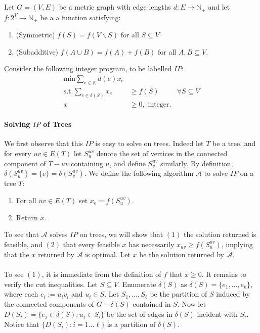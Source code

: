\documentclass[letterpaper,12pt,oneside,onecolumn]{article}
\newcommand{\N}{\mathbb{N}} \newcommand{\R}{\mathbb{R}}
\newcommand{\cA}{\mathcal{A}} \newcommand{\cB}{\mathcal{B}}
\begin{document}
\section{}
\paragraph{}
Let $G=(V,E)$ be a metric graph with edge lengths $d: E \rightarrow \N_+$ and let $f : 2^V \rightarrow \N_+$  be a a function satisfying:
\begin{enumerate}
\item (Symmetric) $f(S) = f(V\backslash S)$ for all $S \subseteq V$
\item (Subadditive) $f(A \cup B) = f(A) + f(B)$ for all $A,B \subseteq V$.
\end{enumerate}
Consider the following integer program, to be labelled $IP$:
\begin{align*}
\text{min} \sum_{e \in E} d(e) x_e\\
\text{s.t.} \sum_{e\in \delta(S)} x_e &\geq f(S) &\forall S \subseteq V \\
x &\geq 0, \text{ integer}.
\end{align*}
\paragraph{Solving $IP$ of Trees}
We first observe that this $IP$ is easy to solve on trees. Indeed let $T$ be a tree, and for every $uv \in E(T)$ let $S^{uv}_u$ denote the set of vertices in the connected component of $T-uv$ containing $u$, and define $S^{uv}_v$ similarly. By definition, $\delta(S^{uv}_u) =  \{e\} = \delta(S^{uv}_v)$. We define the following algorithm $\cA$ to solve $IP$ on a tree $T$:
\begin{enumerate}
\item For all $uv \in E(T)$ set $x_e = f(S^{uv}_u)$.
\item Return $x$.
\end{enumerate}
To see that $\cA$ solves $IP$ on trees, we will show that $(1)$ the solution returned is feasible, and $(2)$ that every feasible $x$ has necessarily $x_{uv} \geq f(S^{uv}_u)$, implying that the $x$ returned by $\cA$ is optimal.  Let $x$ be the solution returned by $\cA$. 
\paragraph{}
To see $(1)$, it is immediate from the definition of $f$ that $x \geq 0$. It remains to verify the cut inequalities. Let $S \subseteq V$. Enumerate $\delta(S)$ as $\delta(S) = \{e_1, \dots, e_k \}$, where each $e_i := u_iv_i$ and $u_i \in S$. Let $S_1, \dots, S_\ell$ be the partition of $S$ induced by the connected components of $G-\delta(S)$ contained in $S$.  Now let $D(S_i) = \{ e_j \in \delta(S) : u_j \in S_i \}$ be the set of edges in $\delta(S)$ incident with $S_i$. Notice that $\{D(S_i): i = 1\dots \ell\}$ is a partition of $\delta(S)$. 
\end{document}
